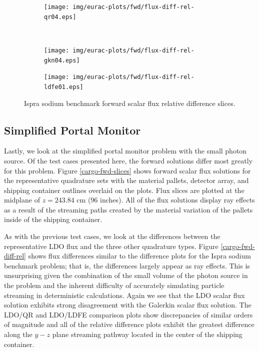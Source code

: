 \clearpage
\begin{figure}[!htb]
\begin{subfigure}{\textwidth}
\centering
\texttt{[image: img/eurac-plots/fwd/flux-diff-rel-qr04.eps]}
\end{subfigure}
\\
\begin{subfigure}{\textwidth}
\centering
\texttt{[image: img/eurac-plots/fwd/flux-diff-rel-gkn04.eps]}
\end{subfigure}
\end{figure}
\clearpage
\begin{figure}[!htb]
\ContinuedFloat
\begin{subfigure}{\textwidth}
\centering
\texttt{[image: img/eurac-plots/fwd/flux-diff-rel-ldfe01.eps]}
\end{subfigure}
\caption{Ispra sodium benchmark forward scalar flux relative difference slices.}
\label{eurac-fwd-diff-rel}
\end{figure}

\FloatBarrier
\subsection{Simplified Portal Monitor}

Lastly, we look at the simplified portal monitor problem with the small photon source.
Of the test cases presented here, the forward solutions differ most greatly for this
problem. Figure \ref{cargo-fwd-slices} shows forward scalar flux solutions for the
representative quadrature sets with the material pallets, detector array, and shipping
container outlines overlaid on the plots. Flux slices are plotted at the midplane of
$z = 243.84$ cm (96 inches). All of the flux solutions display ray 
effects as a result of the streaming paths created by the material variation of the
pallets inside of the shipping container.

As with the previous test cases, we look at the differences between the 
representative LDO flux and the three other quadrature types. Figure
\ref{cargo-fwd-diff-rel} shows flux differences similar to the difference plots for 
the Ispra sodium benchmark problem; that is, the differences largely appear as ray 
effects. This is unsurprising given the combination of the small volume of the photon 
source in the problem and the inherent difficulty of accurately simulating particle
streaming in deterministic calculations. Again we see that the LDO scalar flux 
solution exhibits strong disagreement with the Galerkin scalar flux solution. The
LDO/QR and LDO/LDFE comparison plots show discrepancies of similar orders of 
magnitude and all of the relative difference plots exhibit the greatest difference
along the $y-z$ plane streaming pathway located in the center of the shipping 
container.

